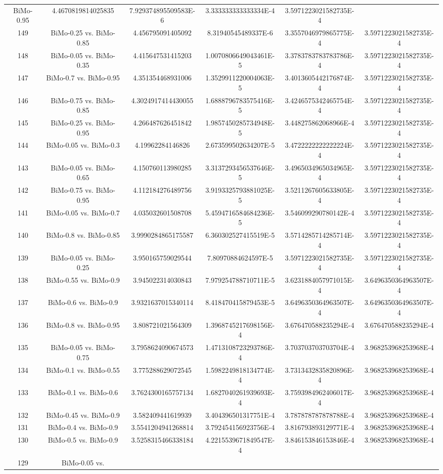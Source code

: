 \documentclass[a4paper,10pt]{article}
\begin{document}
\begin{landscape}
\begin{table}[!htp]
\begin{tabular}{cccccc}
BiMo-0.95&4.4670819814025835&7.929374895509583E-6&3.333333333333334E-4&3.5971223021582735E-4\\149&BiMo-0.25 vs. BiMo-0.85&4.456795091405092&8.31940545489337E-6&3.3557046979865775E-4&3.5971223021582735E-4\\148&BiMo-0.05 vs. BiMo-0.35&4.415647531415203&1.0070806649043461E-5&3.3783783783783786E-4&3.5971223021582735E-4\\147&BiMo-0.7 vs. BiMo-0.95&4.351354468931006&1.3529911220004063E-5&3.4013605442176874E-4&3.5971223021582735E-4\\146&BiMo-0.75 vs. BiMo-0.85&4.3024917414430055&1.6888796783575416E-5&3.4246575342465754E-4&3.5971223021582735E-4\\145&BiMo-0.25 vs. BiMo-0.95&4.266487626451842&1.9857450285734948E-5&3.448275862068966E-4&3.5971223021582735E-4\\144&BiMo-0.05 vs. BiMo-0.3&4.19962284146826&2.673599502634207E-5&3.4722222222222224E-4&3.5971223021582735E-4\\143&BiMo-0.05 vs. BiMo-0.65&4.150760113980285&3.3137293456537646E-5&3.4965034965034965E-4&3.5971223021582735E-4\\142&BiMo-0.75 vs. BiMo-0.95&4.112184276489756&3.9193325793881025E-5&3.5211267605633805E-4&3.5971223021582735E-4\\141&BiMo-0.05 vs. BiMo-0.7&4.035032601508708&5.4594716584684236E-5&3.546099290780142E-4&3.5971223021582735E-4\\140&BiMo-0.8 vs. BiMo-0.85&3.9990284865175587&6.360302527415519E-5&3.5714285714285714E-4&3.5971223021582735E-4\\139&BiMo-0.05 vs. BiMo-0.25&3.950165759029544&7.80970884624597E-5&3.5971223021582735E-4&3.5971223021582735E-4\\138&BiMo-0.55 vs. BiMo-0.9&3.945022314030843&7.979254788710711E-5&3.6231884057971015E-4&3.6496350364963507E-4\\137&BiMo-0.6 vs. BiMo-0.9&3.9321637015340114&8.418470415879453E-5&3.6496350364963507E-4&3.6496350364963507E-4\\136&BiMo-0.8 vs. BiMo-0.95&3.808721021564309&1.3968745217698156E-4&3.676470588235294E-4&3.676470588235294E-4\\135&BiMo-0.05 vs. BiMo-0.75&3.7958624090674573&1.4713108723293786E-4&3.703703703703704E-4&3.968253968253968E-4\\134&BiMo-0.1 vs. BiMo-0.55&3.775288629072545&1.5982249818134774E-4&3.7313432835820896E-4&3.968253968253968E-4\\133&BiMo-0.1 vs. BiMo-0.6&3.7624300165757134&1.6827040261939693E-4&3.7593984962406017E-4&3.968253968253968E-4\\132&BiMo-0.45 vs. BiMo-0.9&3.582409441619939&3.404396501317751E-4&3.787878787878788E-4&3.968253968253968E-4\\131&BiMo-0.4 vs. BiMo-0.9&3.5541204941268814&3.792454156923756E-4&3.816793893129771E-4&3.968253968253968E-4\\130&BiMo-0.5 vs. BiMo-0.9&3.5258315466338184&4.2215539671849547E-4&3.846153846153846E-4&3.968253968253968E-4\\129&BiMo-0.05 vs. 
\end{tabular}
\end{table}
\end{landscape}
\end{document}
